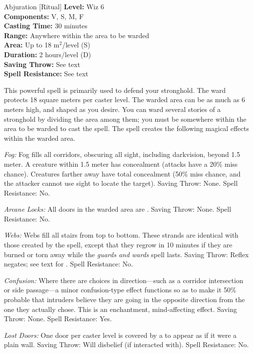 {Abjuration [Ritual]}
{
	\textbf{Level:}
	Wiz 6\\
	\textbf{Components:}
	V, S, M, F\\
	\textbf{Casting Time:}
	30 minutes\\
	\textbf{Range:}
	Anywhere within the area to be warded\\
	\textbf{Area:}
	Up to 18 m$^2$/level (S)\\
	\textbf{Duration:}
	2 hours/level (D)\\
	\textbf{Saving Throw:}
	See text\\
	\textbf{Spell Resistance:}
	See text\\
}
{
	This powerful spell is primarily used to defend your stronghold. The ward protects 18 square meters per caster level. The warded area can be as much as 6 meters high, and shaped as you desire. You can ward several stories of a stronghold by dividing the area among them; you must be somewhere within the area to be warded to cast the spell. The spell creates the following magical effects within the warded area.

	\textit{Fog:}
	Fog fills all corridors, obscuring all sight, including darkvision, beyond 1.5 meter. A creature within 1.5 meter has concealment (attacks have a 20\% miss chance). Creatures farther away have total concealment (50\% miss chance, and the attacker cannot use sight to locate the target). Saving Throw: None. Spell Resistance: No.

	\textit{Arcane Locks:}
	All doors in the warded area are . Saving Throw: None. Spell Resistance: No.

	\textit{Webs:}
	Webs fill all stairs from top to bottom. These strands are identical with those created by the  spell, except that they regrow in 10 minutes if they are burned or torn away while the \emph{guards and wards} spell lasts. Saving Throw: Reflex negates; see text for . Spell Resistance: No.

	\textit{Confusion:}
	Where there are choices in direction---such as a corridor intersection or side passage---a minor confusion-type effect functions so as to make it 50\% probable that intruders believe they are going in the opposite direction from the one they actually chose. This is an enchantment, mind-affecting effect. Saving Throw: None. Spell Resistance: Yes.

	\textit{Lost Doors:}
	One door per caster level is covered by a  to appear as if it were a plain wall. Saving Throw: Will disbelief (if interacted with). Spell Resistance: No.

}
